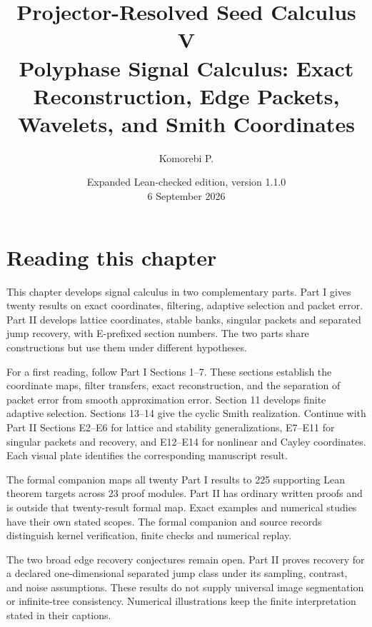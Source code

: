 \documentclass[11pt,letterpaper]{article}
\title{\textbf{Projector-Resolved Seed Calculus V}\\[0.45em]
\large Polyphase Signal Calculus: Exact Reconstruction, Edge Packets, Wavelets, and Smith Coordinates}
\author{Komorebi P.}
\date{Expanded Lean-checked edition, version 1.1.0\\\small 6 September 2026}
\theoremstyle{plain}
\theoremstyle{plain}
\theoremstyle{plain}
\theoremstyle{definition}
\theoremstyle{definition}
\theoremstyle{definition}
\theoremstyle{definition}
\theoremstyle{remark}
\theoremstyle{remark}
\theoremstyle{remark}
\theoremstyle{remark}
\begin{document}
\KomorebiCover
{}

\section*{Reading this chapter}
This chapter develops signal calculus in two complementary parts. Part I gives twenty results on exact coordinates, filtering, adaptive selection and packet error. Part II develops lattice coordinates, stable banks, singular packets and separated jump recovery, with E-prefixed section numbers. The two parts share constructions but use them under different hypotheses.

For a first reading, follow Part I Sections 1--7. These sections establish the coordinate maps, filter transfers, exact reconstruction, and the separation of packet error from smooth approximation error. Section 11 develops finite adaptive selection. Sections 13--14 give the cyclic Smith realization. Continue with Part II Sections E2--E6 for lattice and stability generalizations, E7--E11 for singular packets and recovery, and E12--E14 for nonlinear and Cayley coordinates. Each visual plate identifies the corresponding manuscript result.

The formal companion maps all twenty Part I results to 225 supporting Lean theorem targets across 23 proof modules. Part II has ordinary written proofs and is outside that twenty-result formal map. Exact examples and numerical studies have their own stated scopes. The formal companion and source records distinguish kernel verification, finite checks and numerical replay.

The two broad edge recovery conjectures remain open. Part II proves recovery for a declared one-dimensional separated jump class under its sampling, contrast, and noise assumptions. These results do not supply universal image segmentation or infinite-tree consistency. Numerical illustrations keep the finite interpretation stated in their captions.
\clearpage
\tableofcontents
\clearpage
\listoffigures
\listoftables
\clearpage
{}
\end{document}

